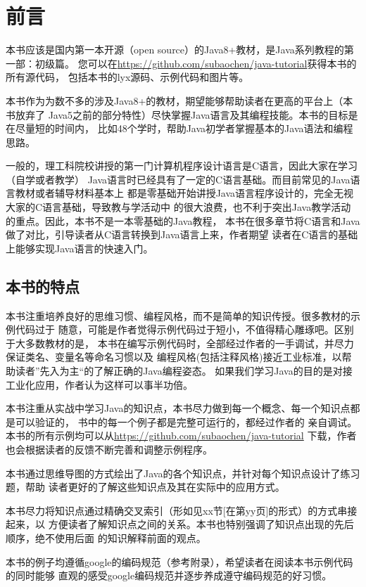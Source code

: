 \frontmatter
\chapter{前言}
本书应该是国内第一本开源（open source）的Java8+教材，是Java系列教程的第一部：初级篇。
您可以在\url{https://github.com/subaochen/java-tutorial}获得本书的所有源代码，
包括本书的lyx源码、示例代码和图片等。

本书作为为数不多的涉及Java8+的教材，期望能够帮助读者在更高的平台上（本书放弃了
Java5之前的部分特性）尽快掌握Java语言及其编程技能。本书的目标是在尽量短的时间内，
比如48个学时，帮助Java初学者掌握基本的Java语法和编程思路。

一般的，理工科院校讲授的第一门计算机程序设计语言是C语言，因此大家在学习（自学或者教学）
Java语言时已经具有了一定的C语言基础。而目前常见的Java语言教材或者辅导材料基本上
都是零基础开始讲授Java语言程序设计的，完全无视大家的C语言基础，导致教与学活动中
的很大浪费，也不利于突出Java教学活动的重点。因此，本书不是一本零基础的Java教程，
本书在很多章节将C语言和Java做了对比，引导读者从C语言转换到Java语言上来，作者期望
读者在C语言的基础上能够实现Java语言的快速入门。

\section*{本书的特点}
本书注重培养良好的思维习惯、编程风格，而不是简单的知识传授。很多教材的示例代码过于
随意，可能是作者觉得示例代码过于短小，不值得精心雕琢吧。区别于大多数教材的是，
本书在编写示例代码时，全部经过作者的一手调试，并尽力保证类名、变量名等命名习惯以及
编程风格(包括注释风格)接近工业标准，以帮助读者”先入为主“的了解正确的Java编程姿态。
如果我们学习Java的目的是对接工业化应用，作者认为这样可以事半功倍。

本书注重从实战中学习Java的知识点，本书尽力做到每一个概念、每一个知识点都是可以验证的，
书中的每一个例子都是完整可运行的，都经过作者的
亲自调试。本书的所有示例均可以从\url{https://github.com/subaochen/java-tutorial}
下载，作者也会根据读者的反馈不断完善和调整示例程序。

本书通过思维导图的方式绘出了Java的各个知识点，并针对每个知识点设计了练习题，帮助
读者更好的了解这些知识点及其在实际中的应用方式。

本书尽力将知识点通过精确交叉索引（形如见xx节[在第yy页]的形式）的方式串接起来，以
方便读者了解知识点之间的关系。本书也特别强调了知识点出现的先后顺序，绝不使用后面
的知识解释前面的观点。

本书的例子均遵循google的编码规范（参考附录），希望读者在阅读本书示例代码的同时能够
直观的感受google编码规范并逐步养成遵守编码规范的好习惯。

